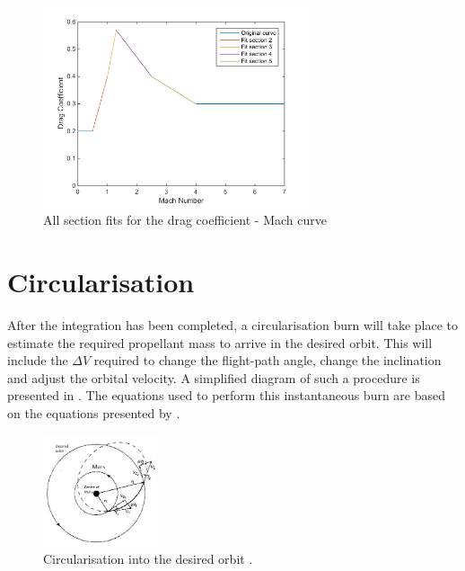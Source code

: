 \begin{figure}[H]
\centering
\includegraphics[width=0.7\textwidth]{figures/software/dragCoeffFit.png}
\caption{All section fits for the drag coefficient - Mach curve}
\label{fig:dragCoeffFit}
\end{figure}

\pagebreak

\section{Circularisation}
\label{sec:modelCircularisation}
After the integration has been completed, a circularisation burn will take place to estimate the required propellant mass to arrive in the desired orbit. This will include the $\Delta V$ required to change the flight-path angle, change the inclination and adjust the orbital velocity. A simplified diagram of such a procedure is presented in . The equations used to perform this instantaneous burn are based on the equations presented by \cite{wakker2010}.



\begin{figure}[H]
\centering
\includegraphics[width=0.3\textwidth]{figures/circularisation/deltaVcircularOrbitMars_wakker2010.png}
\caption{Circularisation into the desired orbit \citep{wakker2010}.}
\label{fig:deltaVcircularOrbitMars_wakker2010}
\end{figure}

